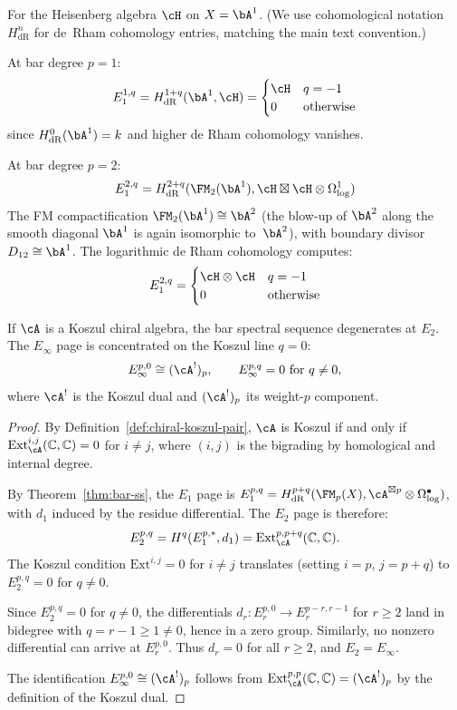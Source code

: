 \begin{computation}
\label{comp:e1-heisenberg}
For the Heisenberg algebra $\cH$ on $X = \bA^1$.  (We use cohomological notation $H^n_{\mathrm{dR}}$ for de~Rham cohomology entries, matching the main text convention.)

At bar degree $p = 1$:
\[
E_1^{1,q} = H^{1+q}_{\mathrm{dR}}(\bA^1, \cH) = \begin{cases} 
\cH & q = -1 \\ 0 & \text{otherwise} 
\end{cases}
\]
since $H^0_{\mathrm{dR}}(\bA^1) = k$ and higher de Rham cohomology vanishes.

At bar degree $p = 2$:
\[
E_1^{2,q} = H^{2+q}_{\mathrm{dR}}(\FM_2(\bA^1), \cH \boxtimes \cH \otimes \Omega^1_{\log})
\]
The FM compactification $\FM_2(\bA^1) \cong \bA^2$ (the blow-up of $\bA^2$ along the smooth diagonal $\bA^1$ is again isomorphic to~$\bA^2$), with boundary divisor
$D_{12} \cong \bA^1$. The logarithmic de Rham cohomology computes:
\[
E_1^{2,q} = \begin{cases} 
\cH \otimes \cH & q = -1 \\ 0 & \text{otherwise}
\end{cases}
\]
\end{computation}

\begin{proposition}
\label{prop:degen-koszul}
If $\cA$ is a Koszul chiral algebra, the bar spectral sequence
degenerates at $E_2$.  The $E_\infty$ page is concentrated on the
Koszul line $q = 0$:
\[
E_\infty^{p,0} \cong (\cA^!)_p, \qquad
E_\infty^{p,q} = 0 \text{ for } q \neq 0,
\]
where $\cA^!$ is the Koszul dual and $(\cA^!)_p$ its weight-$p$ component.
\end{proposition}

\begin{proof}
By Definition~\ref{def:chiral-koszul-pair}, $\cA$ is Koszul if and only if $\mathrm{Ext}^{i,j}_{\cA}(\mathbb{C}, \mathbb{C}) = 0$ for $i \neq j$, where $(i,j)$ is the bigrading by homological and internal degree.

By Theorem~\ref{thm:bar-ss}, the $E_1$ page is $E_1^{p,q} = H^{p+q}_{\mathrm{dR}}(\FM_p(X), \cA^{\boxtimes p} \otimes \Omega^\bullet_{\log})$, with $d_1$ induced by the residue differential. The $E_2$ page is therefore:
\[
E_2^{p,q} = H^q(E_1^{p,*}, d_1) = \mathrm{Ext}^{p,p+q}_{\cA}(\mathbb{C}, \mathbb{C}).
\]
The Koszul condition $\mathrm{Ext}^{i,j} = 0$ for $i \neq j$ translates (setting $i = p$, $j = p + q$) to $E_2^{p,q} = 0$ for $q \neq 0$.

Since $E_2^{p,q} = 0$ for $q \neq 0$, the differentials $d_r: E_r^{p,0} \to E_r^{p-r, r-1}$ for $r \geq 2$ land in bidegree with $q = r - 1 \geq 1 \neq 0$, hence in a zero group.  Similarly, no nonzero differential can arrive at $E_r^{p,0}$.  Thus $d_r = 0$ for all $r \geq 2$, and $E_2 = E_\infty$.

The identification $E_\infty^{p,0} \cong (\cA^!)_p$ follows from $\mathrm{Ext}^{p,p}_{\cA}(\mathbb{C}, \mathbb{C}) = (\cA^!)_p$ by the definition of the Koszul dual.
\end{proof}


